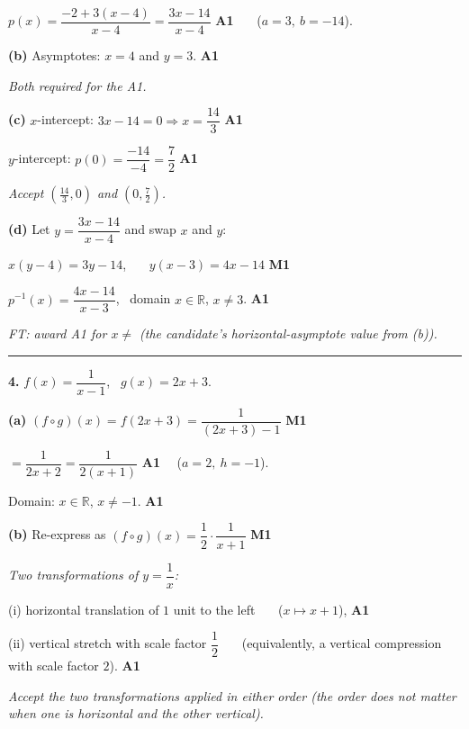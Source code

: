 \documentclass[12pt, twoside]{article}
\begin{document}
$\displaystyle p(x)=\dfrac{-2+3(x-4)}{x-4}=\dfrac{3x-14}{x-4}$ \hfill \textbf{A1}
\ \ \ ($a=3,\ b=-14$).

\medskip

\textbf{(b)} Asymptotes: $x=4$ and $y=3$. \hfill \textbf{A1}

\emph{Both required for the A1.}

\medskip

\textbf{(c)} $x$-intercept: $3x-14=0 \Rightarrow x=\dfrac{14}{3}$ \hfill \textbf{A1}

$y$-intercept: $p(0)=\dfrac{-14}{-4}=\dfrac{7}{2}$ \hfill \textbf{A1}

\emph{Accept $\left(\tfrac{14}{3},0\right)$ and $\left(0,\tfrac{7}{2}\right)$.}

\medskip

\textbf{(d)} Let $y=\dfrac{3x-14}{x-4}$ and swap $x$ and $y$:

$x(y-4)=3y-14$, \ \ \ $y(x-3)=4x-14$ \hfill \textbf{M1}

$\displaystyle p^{-1}(x)=\dfrac{4x-14}{x-3}$, \ domain $x\in\mathbb{R}$, $x\ne 3$.
\hfill \textbf{A1}

\emph{FT: award A1 for $x\ne$ (the candidate's horizontal-asymptote value from (b)).}

\bigskip\hrule\bigskip

\noindent\textbf{4.} $f(x)=\dfrac{1}{x-1}$, \ $g(x)=2x+3$.

\medskip

\textbf{(a)} $(f\circ g)(x)=f(2x+3)=\dfrac{1}{(2x+3)-1}$ \hfill \textbf{M1}

$\displaystyle =\dfrac{1}{2x+2}=\dfrac{1}{2(x+1)}$ \hfill \textbf{A1}
\ \ ($a=2,\ h=-1$).

Domain: $x\in\mathbb{R}$, $x\ne -1$. \hfill \textbf{A1}

\medskip

\textbf{(b)} Re-express as $\displaystyle (f\circ g)(x)=\dfrac{1}{2}\cdot\dfrac{1}{x+1}$
\hfill \textbf{M1}

\emph{Two transformations of $y=\dfrac{1}{x}$:}

(i) horizontal translation of $1$ unit to the left
\ \ \ ($x\mapsto x+1$), \hfill \textbf{A1}

(ii) vertical stretch with scale factor $\dfrac{1}{2}$
\ \ \ (equivalently, a vertical compression with scale factor $2$). \hfill \textbf{A1}

\emph{Accept the two transformations applied in either order
(the order does not matter when one is horizontal and the other vertical).}
\end{document}
